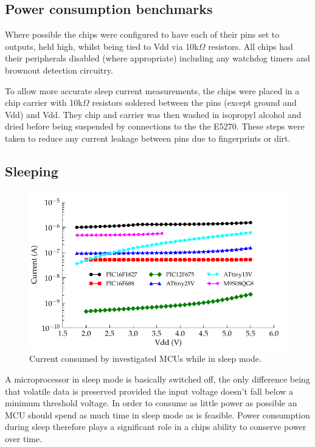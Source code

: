 \subsection{Power consumption benchmarks}

Where possible the chips were configured to have each of their pins
set to outputs, held high, whilst being tied to Vdd via 10k$\Omega$
resistors. All chips had their peripherals disabled (where appropriate)
including any watchdog timers and brownout detection circuitry.

To allow more accurate sleep current measurements, the chips were
placed in a chip carrier with 10k$\Omega$ resistors soldered between
the pins (except ground and Vdd) and Vdd. They chip and carrier was
then washed in isopropyl alcohol and dried before being suspended
by connections to the the E5270. These steps were taken to reduce
any current leakage between pins due to fingerprints or dirt.


\subsection{Sleeping}

\begin{figure}
\begin{centering}
\includegraphics{content/pt1/02-Microcontrollers/graphics/Graph_All_Sleeping_Current}
\par\end{centering}

\centering{}\protect\caption{\label{fig:All_Sleep_Current}Current consumed by investigated MCUs
while in sleep mode.}
\end{figure}


A microprocessor in sleep mode is basically switched off, the only
difference being that volatile data is preserved provided the input
voltage doesn't fall below a minimum threshold voltage. In order to
consume as little power as possible an MCU should spend as much time
in sleep mode as is feasible. Power consumption during sleep therefore
plays a significant role in a chips ability to conserve power over
time.

